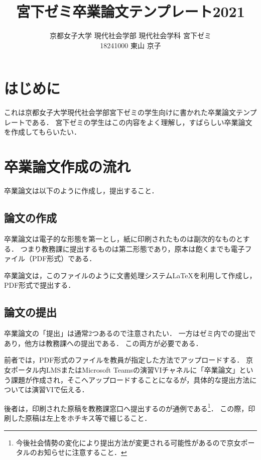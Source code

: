 \documentclass[a4paper,twocolumn,10pt]{ltjsarticle}
\title{宮下ゼミ卒業論文テンプレート2021}
\author{京都女子大学 現代社会学部 現代社会学科 宮下ゼミ\\
18241000 東山 京子}
\begin{document}
\maketitle

\section{はじめに}

これは京都女子大学現代社会学部宮下ゼミの学生向けに書かれた卒業論文テンプレートである．
宮下ゼミの学生はこの内容をよく理解し，すばらしい卒業論文を作成してもらいたい．

\section{卒業論文作成の流れ}

卒業論文は以下のように作成し，提出すること．

\subsection{論文の作成}

卒業論文は電子的な形態を第一とし，紙に印刷されたものは副次的なものとする．
つまり教務課に提出するものは第二形態であり，原本は飽くまでも電子ファイル（PDF形式）である．

卒業論文は，このファイルのように文書処理システム\LaTeX{}を利用して作成し，PDF形式で提出する．

\subsection{論文の提出}

卒業論文の「提出」は通常2つあるので注意されたい．
一方はゼミ内での提出であり，他方は教務課への提出である．
この両方が必要である．

前者では，PDF形式のファイルを教員が指定した方法でアップロードする．
京女ポータル内LMSまたはMicrosoft Teamsの演習VIチャネルに「卒業論文」という課題が作成され，そこへアップロードすることになるが，具体的な提出方法については演習VIで伝える．

後者は，印刷された原稿を教務課窓口へ提出するのが通例である\footnote{今後社会情勢の変化により提出方法が変更される可能性があるので京女ポータルのお知らせに注意すること．}．
この際，印刷した原稿は左上をホチキス等で綴じること．
\end{document}
